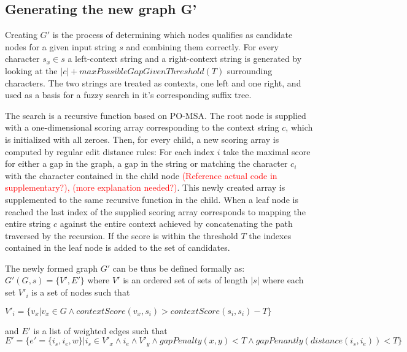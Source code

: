 \documentclass{article}
\begin{document}
\subsection{Generating the new graph G'}
Creating $G'$ is the process of determining which nodes qualifies as candidate nodes for a given input string $s$ and combining them correctly. For every character $s_x \in s$ a left-context string and a right-context string is generated by looking at the $|c| + maxPossibleGapGivenThreshold(T)$ surrounding characters. The two strings are treated as contexts, one left and one right, and used as a basis for a fuzzy search in it's corresponding suffix tree.\\
\par\noindent
The search is a recursive function based on PO-MSA. The root node is supplied with a one-dimensional scoring array corresponding to the context string $c$, which is initialized with all zeroes. Then, for every child, a new scoring array is computed by regular edit distance rules: For each index $i$ take the maximal score for either a gap in the graph, a gap in the string or matching the character $c_i$ with the character contained in the child node \textcolor{red}{(Reference actual code in supplementary?), (more explanation needed?)}. This newly created array is supplemented to the same recursive function in the child. When a leaf node is reached the last index of the supplied scoring array corresponds to mapping the entire string $c$ against the entire context achieved by concatenating the path traversed by the recursion. If the score is within the threshold $T$ the indexes contained in the leaf node is added to the set of candidates.\\
\par\noindent
The newly formed graph $G'$ can be thus be defined formally as:\\
$G'(G, s) = \{V', E'\}$ 
where $V'$ is an ordered set of sets of length $|s|$ where each set $V'_i$ is a set of nodes such that\\
\par\noindent
$V'_i=\{v_x|v_x \in G \wedge contextScore(v_x, s_i) > contextScore(s_i, s_i) - T\}$\\
\par\noindent
and $E'$ is a list of weighted edges such that\\
$E'=\{e'=\{i_s, i_e, w\}|i_s \in V'_x \wedge i_e \wedge V'_y \wedge gapPenalty(x, y) < T \wedge gapPenantly(distance(i_s, i_e)) < T\}$\\
\par\noindent
\end{document}
